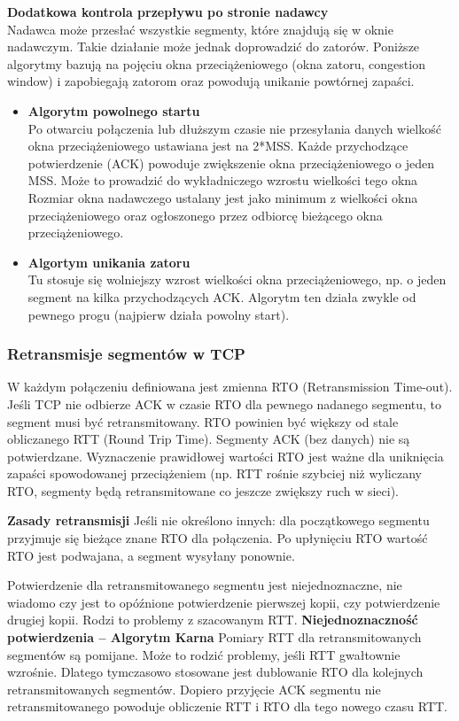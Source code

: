 \documentclass[../main.tex]{subfiles}
\begin{document}
    \textbf{Dodatkowa kontrola przepływu po stronie nadawcy}\\
    Nadawca może przesłać wszystkie segmenty, które znajdują się w oknie nadawczym. Takie działanie może jednak doprowadzić do zatorów. Poniższe algorytmy bazują na pojęciu okna przeciążeniowego (okna zatoru, congestion window) i zapobiegają zatorom oraz powodują unikanie powtórnej zapaści.
    \begin{itemize}
        \item \textbf{Algorytm powolnego startu}\\
        Po otwarciu połączenia lub dłuższym czasie nie przesyłania danych wielkość okna
        przeciążeniowego ustawiana jest na 2*MSS. Każde przychodzące potwierdzenie (ACK)
        powoduje zwiększenie okna przeciążeniowego o jeden MSS. Może to prowadzić do wykładniczego wzrostu wielkości tego okna Rozmiar okna nadawczego ustalany jest jako minimum z wielkości okna przeciążeniowego
        oraz ogłoszonego przez odbiorcę bieżącego okna przeciążeniowego.
        \item \textbf{Algortym unikania zatoru}\\
        Tu stosuje się wolniejszy wzrost wielkości okna przeciążeniowego, np. o jeden
        segment na kilka przychodzących ACK. Algorytm ten działa zwykle od pewnego progu (najpierw działa powolny start).
    \end{itemize}


    \subsubsection{Retransmisje segmentów w TCP}
    W każdym połączeniu definiowana jest zmienna RTO (Retransmission Time-out). Jeśli TCP nie
    odbierze ACK w czasie RTO dla pewnego nadanego segmentu, to segment musi być
    retransmitowany. RTO powinien być większy od stale obliczanego RTT (Round Trip Time).
    Segmenty ACK (bez danych) nie są potwierdzane.
    Wyznaczenie prawidłowej wartości RTO jest ważne dla uniknięcia zapaści spowodowanej
    przeciążeniem (np. RTT rośnie szybciej niż wyliczany RTO, segmenty będą retransmitowane
    co jeszcze zwiększy ruch w sieci).

    \textbf{Zasady retransmisji}
    Jeśli nie określono innych: dla początkowego segmentu przyjmuje się bieżące znane RTO dla
    połączenia. Po upłynięciu RTO wartość RTO jest podwajana, a segment wysyłany ponownie.

    Potwierdzenie dla retransmitowanego segmentu jest niejednoznaczne, nie wiadomo czy jest
    to opóźnione potwierdzenie pierwszej kopii, czy potwierdzenie drugiej kopii.
    Rodzi to problemy z szacowanym RTT.
    \textbf{Niejednoznaczność potwierdzenia – Algorytm Karna}
    Pomiary RTT dla retransmitowanych segmentów są pomijane. Może to rodzić problemy, jeśli
    RTT gwałtownie wzrośnie. Dlatego tymczasowo stosowane jest dublowanie RTO dla
    kolejnych retransmitowanych segmentów. Dopiero przyjęcie ACK segmentu nie
    retransmitowanego powoduje obliczenie RTT i RTO dla tego nowego czasu RTT.
\end{document}
